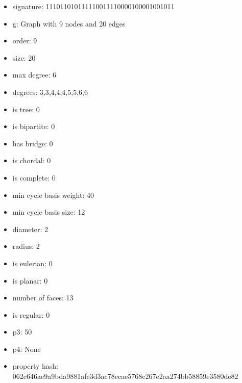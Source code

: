 \newpage
\begin{figure}
\end{figure}
\begin{itemize}
\item signature: 111011010111110011110000100001001011
\item g: Graph with 9 nodes and 20 edges
\item order: 9
\item size: 20
\item max degree: 6
\item degrees: 3,3,4,4,4,5,5,6,6
\item is tree: 0
\item is bipartite: 0
\item has bridge: 0
\item is chordal: 0
\item is complete: 0
\item min cycle basis weight: 40
\item min cycle basis size: 12
\item diameter: 2
\item radius: 2
\item is eulerian: 0
\item is planar: 0
\item number of faces: 13
\item is regular: 0
\item p3: 50
\item p4: None
\item property hash: 062c646ae9a9bda9881afe3d3ac78ecae5768c267e2aa274bb58859e3580de82
\end{itemize}
